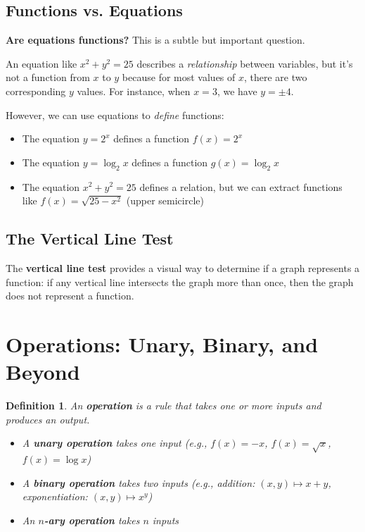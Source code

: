 \documentclass[12pt]{article}
\newtheorem{definition}{Definition}
\begin{document}
\subsection{Functions vs. Equations}

\textbf{Are equations functions?} This is a subtle but important question.

An equation like $x^2 + y^2 = 25$ describes a \textit{relationship} between variables, but it's not a function from $x$ to $y$ because for most values of $x$, there are two corresponding $y$ values. For instance, when $x = 3$, we have $y = \pm 4$.

However, we can use equations to \textit{define} functions:
\begin{itemize}
\item The equation $y = 2^x$ defines a function $f(x) = 2^x$
\item The equation $y = \log_2 x$ defines a function $g(x) = \log_2 x$
\item The equation $x^2 + y^2 = 25$ defines a relation, but we can extract functions like $f(x) = \sqrt{25 - x^2}$ (upper semicircle)
\end{itemize}

\subsection{The Vertical Line Test}

The \textbf{vertical line test} provides a visual way to determine if a graph represents a function: if any vertical line intersects the graph more than once, then the graph does not represent a function.

\section{Operations: Unary, Binary, and Beyond}

\begin{definition}
An \textbf{operation} is a rule that takes one or more inputs and produces an output.

\begin{itemize}
\item A \textbf{unary operation} takes one input (e.g., $f(x) = -x$, $f(x) = \sqrt{x}$, $f(x) = \log x$)
\item A \textbf{binary operation} takes two inputs (e.g., addition: $(x,y) \mapsto x + y$, exponentiation: $(x,y) \mapsto x^y$)
\item An \textbf{$n$-ary operation} takes $n$ inputs
\end{itemize}
\end{definition}
\end{document}
